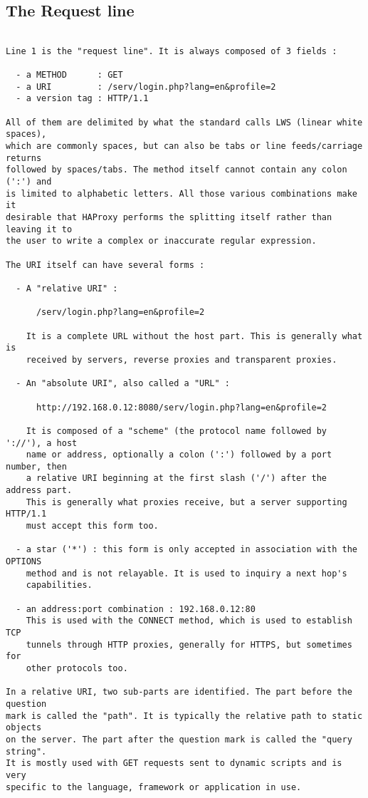 
\subsection{The Request line}

\begin{verbatim}

Line 1 is the "request line". It is always composed of 3 fields :

  - a METHOD      : GET
  - a URI         : /serv/login.php?lang=en&profile=2
  - a version tag : HTTP/1.1

All of them are delimited by what the standard calls LWS (linear white spaces),
which are commonly spaces, but can also be tabs or line feeds/carriage returns
followed by spaces/tabs. The method itself cannot contain any colon (':') and
is limited to alphabetic letters. All those various combinations make it
desirable that HAProxy performs the splitting itself rather than leaving it to
the user to write a complex or inaccurate regular expression.

The URI itself can have several forms :

  - A "relative URI" :

      /serv/login.php?lang=en&profile=2

    It is a complete URL without the host part. This is generally what is
    received by servers, reverse proxies and transparent proxies.

  - An "absolute URI", also called a "URL" :

      http://192.168.0.12:8080/serv/login.php?lang=en&profile=2

    It is composed of a "scheme" (the protocol name followed by '://'), a host
    name or address, optionally a colon (':') followed by a port number, then
    a relative URI beginning at the first slash ('/') after the address part.
    This is generally what proxies receive, but a server supporting HTTP/1.1
    must accept this form too.

  - a star ('*') : this form is only accepted in association with the OPTIONS
    method and is not relayable. It is used to inquiry a next hop's
    capabilities.

  - an address:port combination : 192.168.0.12:80
    This is used with the CONNECT method, which is used to establish TCP
    tunnels through HTTP proxies, generally for HTTPS, but sometimes for
    other protocols too.

In a relative URI, two sub-parts are identified. The part before the question
mark is called the "path". It is typically the relative path to static objects
on the server. The part after the question mark is called the "query string".
It is mostly used with GET requests sent to dynamic scripts and is very
specific to the language, framework or application in use.


\end{verbatim}
